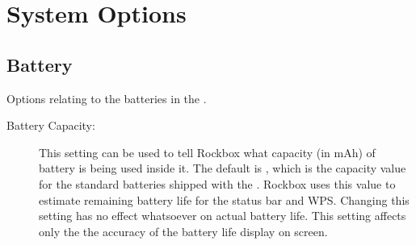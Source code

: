 \section{\label{ref:SystemOptions}System Options}

\subsection{Battery}
    Options relating to the batteries in the \dap.
  \begin{description}
    \item [Battery Capacity: ]This setting can be used to tell Rockbox what
      capacity (in mAh) of battery is being used inside it. The default is
      , which is the capacity value for the standard batteries shipped with the \dap.
      Rockbox uses this value to estimate remaining battery life for the status
      bar and WPS. Changing this setting has no effect whatsoever on actual battery life.
      This setting affects only the the accuracy of the battery life display on screen.
   
    
  \end{description}

